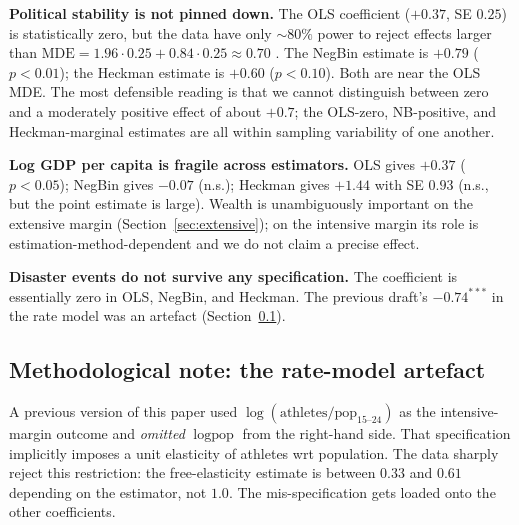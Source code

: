 \documentclass[11pt]{article}
\begin{document}
\textbf{Political stability is not pinned down.}\quad
The OLS coefficient ($+0.37$, SE $0.25$) is statistically zero, but
the data have only $\sim 80\%$ power to reject effects larger than
$\text{MDE} = 1.96 \cdot 0.25 + 0.84 \cdot 0.25 \approx 0.70$
\citep{cohen1988statistical}. The NegBin estimate is $+0.79$
($p<0.01$); the Heckman estimate is $+0.60$ ($p<0.10$). Both are
near the OLS MDE. The most defensible reading is that we cannot
distinguish between zero and a moderately positive effect of about
$+0.7$; the OLS-zero, NB-positive, and Heckman-marginal estimates
are all within sampling variability of one another.

\textbf{Log GDP per capita is fragile across estimators.}\quad
OLS gives $+0.37$ ($p<0.05$); NegBin gives $-0.07$ (n.s.); Heckman
gives $+1.44$ with SE $0.93$ (n.s., but the point estimate is large).
Wealth is unambiguously important on the extensive margin
(Section~\ref{sec:extensive}); on the intensive margin its role is
estimation-method-dependent and we do not claim a precise effect.

\textbf{Disaster events do not survive any specification.}\quad
The coefficient is essentially zero in OLS, NegBin, and Heckman.
The previous draft's $-0.74^{***}$ in the rate model was an artefact
(Section~\ref{sec:rate-pitfall}).

\subsection{Methodological note: the rate-model artefact}
\label{sec:rate-pitfall}

A previous version of this paper used
$\log(\text{athletes}/\text{pop}_{15\text{--}24})$ as the
intensive-margin outcome and \emph{omitted} $\log\text{pop}$ from the
right-hand side. That specification implicitly imposes a unit
elasticity of athletes wrt population. The data sharply reject this
restriction: the free-elasticity estimate is between $0.33$ and
$0.61$ depending on the estimator, not $1.0$. The mis-specification
gets loaded onto the other coefficients.
\end{document}
